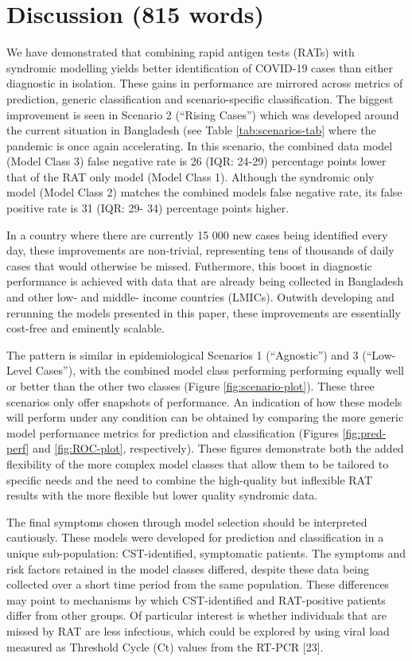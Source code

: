 \documentclass[]{elsarticle} %
\begin{document}
\hypertarget{discussion-815-words}{%
\section{Discussion (815 words)}\label{discussion-815-words}}

We have demonstrated that combining rapid antigen tests (RATs) with syndromic modelling yields better identification of COVID-19 cases than either diagnostic in isolation.
These gains in performance are mirrored across metrics of prediction, generic classification and scenario-specific classification.
The biggest improvement is seen in Scenario 2 (``Rising Cases'') which was developed around the current situation in Bangladesh (see Table \ref{tab:scenarios-tab} where the pandemic is once again accelerating.
In this scenario, the combined data model (Model Class 3) false negative rate is 26 (IQR: 24-29) percentage points lower that of the RAT only model (Model Class 1).
Although the syndromic only model (Model Class 2) matches the combined models false negative rate, its false positive rate is 31 (IQR: 29- 34) percentage points higher.

In a country where there are currently 15 000 new cases being identified every day, these improvements are non-trivial, representing tens of thousands of daily cases that would otherwise be missed.
Futhermore, this boost in diagnostic performance is achieved with data that are already being collected in Bangladesh and other low- and middle- income countries (LMICs).
Outwith developing and rerunning the models presented in this paper, these improvements are essentially cost-free and eminently scalable.

The pattern is similar in epidemiological Scenarios 1 (``Agnostic'') and 3 (``Low-Level Cases''), with the combined model class performing performing equally well or better than the other two classes (Figure \ref{fig:scenario-plot}).
These three scenarios only offer snapshots of performance.
An indication of how these models will perform under any condition can be obtained by comparing the more generic model performance metrics for prediction and classification (Figures \ref{fig:pred-perf} and \ref{fig:ROC-plot}, respectively).
These figures demonstrate both the added flexibility of the more complex model classes that allow them to be tailored to specific needs and the need to combine the high-quality but inflexible RAT results with the more flexible but lower quality syndromic data.

The final symptoms chosen through model selection should be interpreted cautiously.
These models were developed for prediction and classification in a unique sub-population: CST-identified, symptomatic patients.
The symptoms and risk factors retained in the model classes differed, despite these data being collected over a short time period from the same population.
These differences may point to mechanisms by which CST-identified and RAT-positive patients differ from other groups.
Of particular interest is whether individuals that are missed by RAT are less infectious, which could be explored by using viral load measured as Threshold Cycle (Ct) values from the RT-PCR {[}23{]}.
\end{document}
